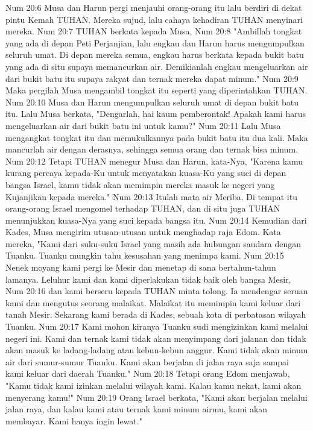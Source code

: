 Num 20:6  Musa dan Harun pergi menjauhi orang-orang itu lalu berdiri di dekat pintu Kemah TUHAN. Mereka sujud, lalu cahaya kehadiran TUHAN menyinari mereka.
Num 20:7  TUHAN berkata kepada Musa,
Num 20:8  "Ambillah tongkat yang ada di depan Peti Perjanjian, lalu engkau dan Harun harus mengumpulkan seluruh umat. Di depan mereka semua, engkau harus berkata kepada bukit batu yang ada di situ supaya memancurkan air. Demikianlah engkau mengeluarkan air dari bukit batu itu supaya rakyat dan ternak mereka dapat minum."
Num 20:9  Maka pergilah Musa mengambil tongkat itu seperti yang diperintahkan TUHAN.
Num 20:10  Musa dan Harun mengumpulkan seluruh umat di depan bukit batu itu. Lalu Musa berkata, "Dengarlah, hai kaum pemberontak! Apakah kami harus mengeluarkan air dari bukit batu ini untuk kamu?"
Num 20:11  Lalu Musa mengangkat tongkat itu dan memukulkannya pada bukit batu itu dua kali. Maka mancurlah air dengan derasnya, sehingga semua orang dan ternak bisa minum.
Num 20:12  Tetapi TUHAN menegur Musa dan Harun, kata-Nya, "Karena kamu kurang percaya kepada-Ku untuk menyatakan kuasa-Ku yang suci di depan bangsa Israel, kamu tidak akan memimpin mereka masuk ke negeri yang Kujanjikan kepada mereka."
Num 20:13  Itulah mata air Meriba. Di tempat itu orang-orang Israel mengomel terhadap TUHAN, dan di situ juga TUHAN menunjukkan kuasa-Nya yang suci kepada bangsa itu.
Num 20:14  Kemudian dari Kades, Musa mengirim utusan-utusan untuk menghadap raja Edom. Kata mereka, "Kami dari suku-suku Israel yang masih ada hubungan saudara dengan Tuanku. Tuanku mungkin tahu kesusahan yang menimpa kami.
Num 20:15  Nenek moyang kami pergi ke Mesir dan menetap di sana bertahun-tahun lamanya. Leluhur kami dan kami diperlakukan tidak baik oleh bangsa Mesir,
Num 20:16  dan kami berseru kepada TUHAN minta tolong. Ia mendengar seruan kami dan mengutus seorang malaikat. Malaikat itu memimpin kami keluar dari tanah Mesir. Sekarang kami berada di Kades, sebuah kota di perbatasan wilayah Tuanku.
Num 20:17  Kami mohon kiranya Tuanku sudi mengizinkan kami melalui negeri ini. Kami dan ternak kami tidak akan menyimpang dari jalanan dan tidak akan masuk ke ladang-ladang atau kebun-kebun anggur. Kami tidak akan minum air dari sumur-sumur Tuanku. Kami akan berjalan di jalan raya saja sampai kami keluar dari daerah Tuanku."
Num 20:18  Tetapi orang Edom menjawab, "Kamu tidak kami izinkan melalui wilayah kami. Kalau kamu nekat, kami akan menyerang kamu!"
Num 20:19  Orang Israel berkata, "Kami akan berjalan melalui jalan raya, dan kalau kami atau ternak kami minum airmu, kami akan membayar. Kami hanya ingin lewat."

